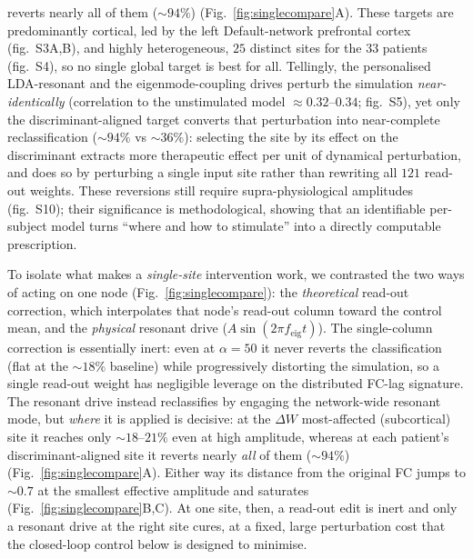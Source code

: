 \documentclass[11pt]{article}
\begin{document}
reverts nearly all of them ($\sim$$94\%$) (Fig.~\ref{fig:singlecompare}A). These targets
are predominantly cortical, led by the left Default-network prefrontal cortex
(fig.~S3A,B), and highly heterogeneous, $25$ distinct sites for the $33$ patients
(fig.~S4), so no single global target is best for all. Tellingly, the
personalised LDA-resonant and the eigenmode-coupling drives perturb the
simulation \emph{near-identically} (correlation to the unstimulated model
$\approx0.32$--$0.34$; fig.~S5), yet only the discriminant-aligned target
converts that perturbation into near-complete reclassification ($\sim$$94\%$ vs
$\sim$$36\%$): selecting the site by its effect on the discriminant extracts more
therapeutic effect per unit of dynamical perturbation, and does so by perturbing
a single input site rather than rewriting all $121$ read-out weights. These
reversions still require supra-physiological amplitudes (fig.~S10); their
significance is methodological, showing that an identifiable per-subject model
turns ``where and how to stimulate'' into a directly computable prescription.

To isolate what makes a \emph{single-site} intervention work, we contrasted the
two ways of acting on one node (Fig.~\ref{fig:singlecompare}): the
\emph{theoretical} read-out correction, which interpolates that node's read-out
column toward the control mean, and the \emph{physical} resonant drive
($A\sin(2\pi f_{\mathrm{eig}}t)$). The single-column correction is essentially
inert: even at $\alpha=50$ it never reverts the classification (flat at the
$\sim$$18\%$ baseline) while progressively distorting the simulation, so a single
read-out weight has negligible leverage on the distributed FC-lag signature. The
resonant drive instead reclassifies by engaging the network-wide resonant mode,
but \emph{where} it is applied is decisive: at the $\Delta W$ most-affected
(subcortical) site it reaches only $\sim$$18$--$21\%$ even at high amplitude,
whereas at each patient's discriminant-aligned site it reverts nearly \emph{all} of them ($\sim$$94\%$)
(Fig.~\ref{fig:singlecompare}A). Either way its distance from the original FC
jumps to $\sim$$0.7$ at the smallest effective amplitude and saturates
(Fig.~\ref{fig:singlecompare}B,C). At one site, then, a read-out edit is inert
and only a resonant drive at the right site cures, at a fixed, large perturbation
cost that the closed-loop control below is designed to minimise.
\end{document}
